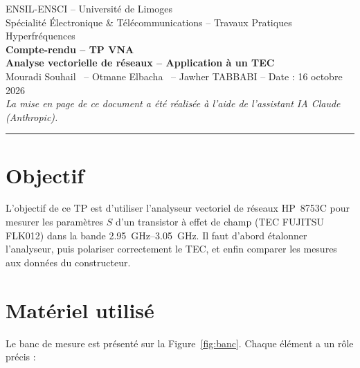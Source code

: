 \documentclass[12pt,a4paper]{article}
\begin{document}
\begin{center}
  ENSIL-ENSCI – Université de Limoges\\
  Spécialité Électronique \& Télécommunications – Travaux Pratiques Hyperfréquences\\[4pt]
  {\Large\bfseries\color{bleu} Compte-rendu – TP VNA}\\[6pt]
  {\bfseries Analyse vectorielle de réseaux – Application à un TEC}\\[6pt]
  Mouradi Souhail \ – Otmane Elbacha \ – Jawher TABBABI \quad – \quad Date : 16 octobre 2026\\[2pt]
  {\small\itshape La mise en page de ce document a été réalisée à l’aide de l’assistant IA Claude (Anthropic).}
\end{center}

\vspace{0.8em}
{\color{bleu}\rule{\linewidth}{1.2pt}}
\vspace{1.0em}

\section{Objectif}

L’objectif de ce TP est d’utiliser l’analyseur vectoriel de réseaux HP~8753C pour mesurer les
paramètres $S$ d’un transistor à effet de champ (TEC FUJITSU FLK012) dans la bande
\SIrange{2,95}{3,05}{\giga\hertz}. Il faut d’abord étalonner l’analyseur, puis polariser
correctement le TEC, et enfin comparer les mesures aux données du constructeur.

\section{Matériel utilisé}

Le banc de mesure est présenté sur la Figure~\ref{fig:banc}. Chaque élément a un rôle précis :
\end{document}
